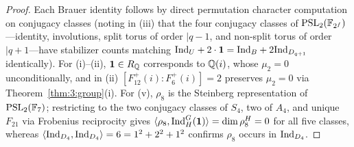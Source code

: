 \begin{proof}
Each Brauer identity follows by direct permutation character computation on conjugacy classes (noting in (iii) that the four conjugacy classes of $\mathrm{PSL}_2(\mathbb{F}_{2^f})$—identity, involutions, split torus of order $\mid q-1$, and non-split torus of order $\mid q+1$—have stabilizer counts matching $\mathrm{Ind}_U + 2\cdot\mathbf{1} = \mathrm{Ind}_B + 2\mathrm{Ind}_{D_{q+1}}$ identically). For (i)--(ii), $\mathbf{1} \in R_{\mathbb{Q}}$ corresponds to $\mathbb{Q}(i)$, whose $\mu_2 = 0$ unconditionally, and in (ii) $[F_{12}^+(i):F_6^+(i)]=2$ preserves $\mu_2 = 0$ via Theorem~\ref{thm:3:group}(i). For (v), $\rho_8$ is the Steinberg representation of $\mathrm{PSL}_2(\mathbb{F}_7)$; restricting to the two conjugacy classes of $S_4$, two of $A_4$, and unique $F_{21}$ via Frobenius reciprocity gives $\langle \rho_8, \mathrm{Ind}_H^G(\mathbf{1})\rangle = \dim \rho_8^H = 0$ for all five classes, whereas $\langle \mathrm{Ind}_{D_4}, \mathrm{Ind}_{D_4} \rangle = 6 = 1^2 + 2^2 + 1^2$ confirms $\rho_8$ occurs in $\mathrm{Ind}_{D_4}$.
\end{proof}
